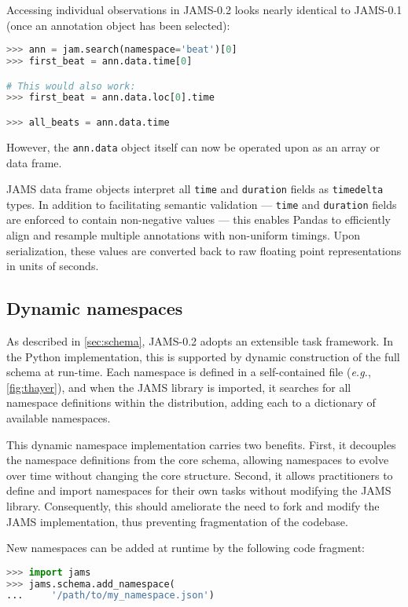 \documentclass{article}
\begin{document}
Accessing individual observations in JAMS-0.2 looks nearly identical to JAMS-0.1
(once an annotation object has been selected):
\begin{lstlisting}[language=python]
>>> ann = jam.search(namespace='beat')[0]
>>> first_beat = ann.data.time[0]

# This would also work:
>>> first_beat = ann.data.loc[0].time

>>> all_beats = ann.data.time
\end{lstlisting}
However, the \texttt{ann.data} object itself can now be operated upon as an array or
data frame.

JAMS data frame objects interpret all \texttt{time} and \texttt{duration} fields as
\texttt{timedelta} types.  In addition to facilitating semantic validation ---
\texttt{time} and \texttt{duration} fields are enforced to contain non-negative values --- 
this enables Pandas to efficiently align and resample multiple annotations with 
non-uniform timings.  Upon serialization, these values are converted back to raw floating
point representations in units of seconds.


\subsection{Dynamic namespaces}\label{sec:imp:namespaces}
As described in \cref{sec:schema}, JAMS-0.2 adopts an extensible task framework.
In the Python implementation, this is supported by dynamic construction of the full
schema at run-time.
Each namespace is defined in a self-contained file (\emph{e.g.}, \cref{fig:thayer}), and
when the JAMS library is imported, it searches for all namespace definitions within the
distribution, adding each to a dictionary of available namespaces.

This dynamic namespace implementation carries two benefits.  First, it decouples the
namespace definitions from the core schema, allowing namespaces to evolve over
time without changing the core structure.  Second, it allows practitioners to define and
import namespaces for their own tasks without modifying the JAMS library.  Consequently,
this should ameliorate the need to fork and modify the JAMS implementation, thus
preventing fragmentation of the codebase.

New namespaces can be added at runtime by the following code fragment:
\begin{lstlisting}[language=python]
>>> import jams
>>> jams.schema.add_namespace(
...     '/path/to/my_namespace.json')
\end{lstlisting}
\end{document}
